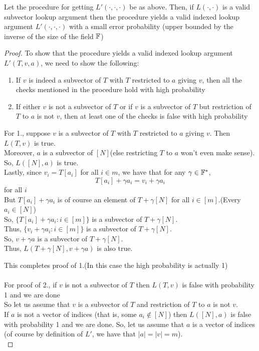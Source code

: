 \begin{lemma}\label{lem:reduction}
Let the procedure for getting $L'(\cdot, \cdot, \cdot)$ be as above. Then, if $L(\cdot, \cdot)$ is a valid subvector lookup argument then the procedure yields a valid indexed lookup argument $L'(\cdot, \cdot, \cdot)$ with a small error probability (upper bounded by the inverse of the size of the field $\mathbb{F}$)
\end{lemma}

\begin{proof}
    To show that the procedure yields a valid indexed lookup argument $L'(T, v, a)$, we need to show the following:
    \begin{enumerate}

        \item If $v$ is indeed a subvector of $T$ with $T$ restricted to $a$ giving $v$, then all the checks mentioned in the procedure hold with high probability
        \item If either $v$ is not a subvector of $T$ or if $v$ is a subvector of $T$ but restriction of $T$ to $a$ is not $v$, then at least one of the checks is false with high probability
    \end{enumerate}

    For 1., suppose $v$ is a subvector of $T$ with $T$ restricted to $a$ giving $v$. Then $L(T, v)$ is true. \\
    Moreover, $a$ is a subvector of $[N]$(else restricting $T$ to $a$ won't even make sense). \\
    So, $L([N], a)$ is true. \\
    Lastly, since $v_i=T[a_i]$ for all $i \in m$, we have that for any $\gamma \in \mathbb{F}^{*}$,
    $$T[a_i]+\gamma a_i=v_i+\gamma a_i$$ for all $i$ \\
    But $T[a_i]+\gamma a_i$ is of course an element of $T+\gamma [N] $ for all $i \in [m]$.(Every $a_i \in [N]$)\\
    So, $\{T[a_i]+\gamma a_i:i \in [m]\}$ is a subvector of $T+\gamma [N] $.\\
    Thus, $\{v_i+\gamma a_i:i \in [m]\}$ is a subvector of $T+\gamma [N] $.\\
    So, $v+\gamma a$ is a subvector of $T+\gamma [N] $.\\
    Thus, $L(T+\gamma[N], v+\gamma a)$ is also true.

    This completes proof of 1.(In this case the high probability is actually 1) \\\\
    For proof of 2., if $v$ is not a subvector of $T$ then $L(T, v)$ is false with probability 1 and we are done \\
    So let us assume that $v$ is a subvector of $T$ and restriction of $T$ to $a$ is not $v$.\\
    If $a$ is not a vector of indices (that is, some $a_i \notin [N]$) then $L([N], a)$ is false with probability 1 and we are done. So, let us assume that $a$ is a vector of indices (of course by definition of $L'$, we have that $|a|=|v|=m$).\\


\end{proof}

